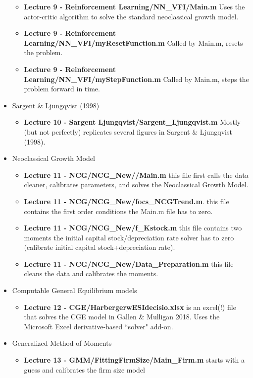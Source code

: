 \documentclass[a4paper]{article}
\begin{document}
\begin{itemize}
\begin{itemize}
\item \textbf{Lecture 9 - Reinforcement Learning/NN\_VFI/Main.m} Uses the actor-critic algorithm to solve the standard neoclassical growth model.
\item \textbf{Lecture 9 - Reinforcement Learning/NN\_VFI/myResetFunction.m} Called by Main.m, resets the problem.
\item \textbf{Lecture 9 - Reinforcement Learning/NN\_VFI/myStepFunction.m} Called by Main.m, steps the problem forward in time.
\end{itemize}
\item Sargent \& Ljungqvist (1998)
\begin{itemize}
\item \textbf{Lecture 10 - Sargent Ljungqvist/Sargent\_Ljungqvist.m} Mostly (but not perfectly) replicates several figures in Sargent \& Ljungqvist (1998).
\end{itemize}
\item Neoclassical Growth Model
\begin{itemize}
\item \textbf{Lecture 11 - NCG/NCG\_New//Main.m} this file first calls the data cleaner, calibrates parameters, and solves the Neoclassical Growth Model.  
\item \textbf{Lecture 11 - NCG/NCG\_New/focs\_NCGTrend.m}. this file contains the first order conditions the Main.m file has to zero.
\item \textbf{Lecture 11 - NCG/NCG\_New/f\_Kstock.m} this file contains two moments the initial capital stock/depreciation rate solver has to zero (calibrate initial capital stock+depreciation rate).
\item \textbf{Lecture 11 - NCG/NCG\_New/Data\_Preparation.m} this file cleans the data and calibrates the moments.
\end{itemize}
\item Computable General Equilibrium models
\begin{itemize}
\item \textbf{Lecture 12 - CGE/HarbergerwESIdecisio.xlsx} is an excel(!) file that solves the CGE model in Gallen \& Mulligan 2018.  Uses the Microsoft Excel derivative-based ``solver" add-on.
\end{itemize}
\item Generalized Method of Moments
\begin{itemize}
\item \textbf{Lecture 13 - GMM/FittingFirmSize/Main\_Firm.m} starts with a guess and calibrates the firm size model

\end{itemize}
\end{itemize}
\end{document}
